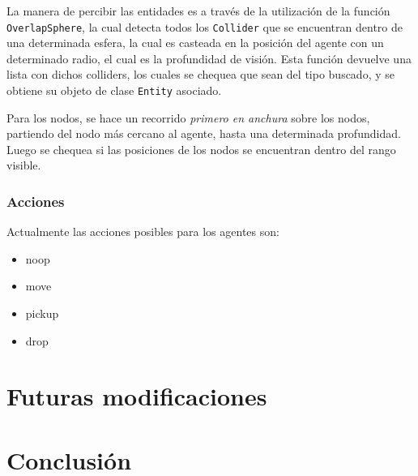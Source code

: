 \documentclass[a4paper,oneside]{article}
\begin{document}
La manera de percibir las entidades es a través de la utilización de la función
\texttt{OverlapSphere}, la cual detecta todos los \texttt{Collider} que se encuentran 
dentro de una determinada esfera, la cual es casteada en la posición del agente con un
determinado radio, el cual es la profundidad de visión. Esta función devuelve una lista
con dichos colliders, los cuales se chequea que sean del tipo buscado, y se obtiene su
objeto de clase \texttt{Entity} asociado. 

Para los nodos, se hace un recorrido \textit{primero en anchura} sobre los nodos, 
partiendo del nodo más cercano al agente, hasta una determinada profundidad. Luego se 
chequea si las posiciones de los nodos se encuentran dentro del rango visible.

\subsubsection{Acciones}

Actualmente las acciones posibles para los agentes son:

\begin{itemize}
\ttfamily
\item noop
\item move
\item pickup
\item drop
\end{itemize}

\section{Futuras modificaciones}

\section{Conclusión}
\end{document}
